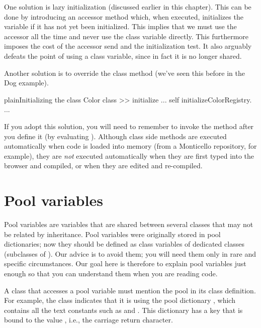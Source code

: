 \documentclass[10pt,twoside,english]{_support/latex/sbabook/sbabook}
\begin{document}
One solution is lazy initialization (discussed earlier in this chapter). This
can be done by introducing an accessor method which, when executed, initializes
the variable if it has not yet been initialized. This implies that we must use
the accessor all the time and never use the class variable directly. This
furthermore imposes the cost of the accessor send and the initialization test.
It also arguably defeats the point of using a class variable, since in fact it
is no longer shared.

Another solution is to override the class method  (we've seen this
before in the Dog example).

\begin{listing}[float, label=scr:colorClassInit]{plain}{Initializing the  class}
Color class >> initialize
    ...
    self initializeColorRegistry.
    ...
\end{listing}

If you adopt this solution, you will need to remember to invoke the
 method after you define it (by evaluating ).
Although class side  methods are executed automatically when code
is loaded into memory (from a Monticello repository, for example), they are
\textit{not} executed automatically when they are first typed into the browser and
compiled, or when they are edited and re-compiled.
\section{Pool variables}
Pool variables are variables that are shared between several classes that may
not be related by inheritance. Pool variables were originally stored in pool
dictionaries; now they should be defined as class variables of dedicated classes
(subclasses of ). Our advice is to avoid them; you will need them
only in rare and specific circumstances. Our goal here is therefore to explain
pool variables just enough so that you can understand them when you are reading
code.

A class that accesses a pool variable must mention the pool in its class
definition. For example, the class  indicates that it is using the pool
dictionary , which contains all the text constants such as
 and . This dictionary has a key  that is bound to the value
, i.e., the carriage return character.
\end{document}
